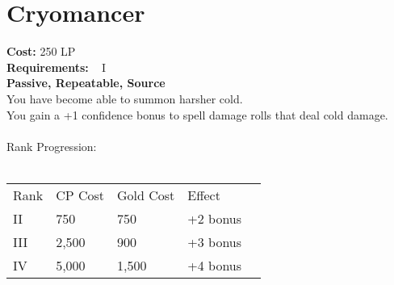 \section{Cryomancer}\label{perk:cryomancer}
\textbf{Cost:} 250 LP\\
\textbf{Requirements:} ~ I\\
\textbf{Passive, Repeatable, Source}\\
You have become able to summon harsher cold.\\
You gain a +1 confidence bonus to spell damage rolls that deal cold damage.\\
\\
Rank Progression:\\
\\
\begin{tabular}{l | l | l | l | l}
    Rank & CP Cost & Gold Cost &  Effect\\
    II & 750 & 750 & +2 bonus\\
    III & 2,500 & 900 & +3 bonus\\
    IV & 5,000 & 1,500 & +4 bonus\\
\end{tabular}